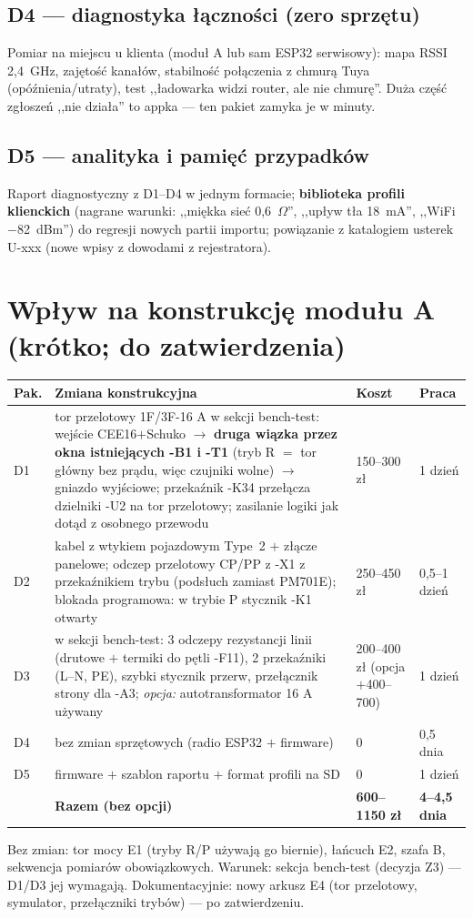 \documentclass[11pt,a4paper]{article}
\newcommand{\ohm}{$\Omega$}
\begin{document}
\subsection{D4 --- diagnostyka łączności (zero sprzętu)}
Pomiar na miejscu u klienta (moduł A lub sam ESP32 serwisowy): mapa RSSI 2,4~GHz, zajętość kanałów,
stabilność połączenia z chmurą Tuya (opóźnienia/utraty), test ,,ładowarka widzi router, ale nie
chmurę''. Duża część zgłoszeń ,,nie działa'' to appka --- ten pakiet zamyka je w minuty.
\subsection{D5 --- analityka i pamięć przypadków}
Raport diagnostyczny z D1--D4 w jednym formacie; \textbf{biblioteka profili klienckich} (nagrane
warunki: ,,miękka sieć 0,6~\ohm'', ,,upływ tła 18~mA'', ,,WiFi $-$82~dBm'') do regresji nowych
partii importu; powiązanie z katalogiem usterek U-xxx (nowe wpisy z dowodami z rejestratora).

\section{Wpływ na konstrukcję modułu A (krótko; do zatwierdzenia)}
\begin{longtable}{@{}p{}p{}p{}p{}@{}}
\toprule
\textbf{Pak.} & \textbf{Zmiana konstrukcyjna} & \textbf{Koszt} & \textbf{Praca}\\
\midrule
D1 & tor przelotowy 1F/3F-16 A w sekcji bench-test: wejście CEE16$+$Schuko $\to$ \textbf{druga
wiązka przez okna istniejących -B1 i -T1} (tryb R $=$ tor główny bez prądu, więc czujniki wolne)
$\to$ gniazdo wyjściowe; przekaźnik -K34 przełącza dzielniki -U2 na tor przelotowy; zasilanie
logiki jak dotąd z osobnego przewodu & 150--300 zł & 1 dzień\\
D2 & kabel z wtykiem pojazdowym Type~2 $+$ złącze panelowe; odczep przelotowy CP/PP z -X1
z przekaźnikiem trybu (podsłuch zamiast PM701E); blokada programowa: w trybie P stycznik -K1
otwarty & 250--450 zł & 0,5--1 dzień\\
D3 & w sekcji bench-test: 3 odczepy rezystancji linii (drutowe $+$ termiki do pętli -F11),
2 przekaźniki (L--N, PE), szybki stycznik przerw, przełącznik strony dla -A3; \emph{opcja:}
autotransformator 16 A używany & 200--400 zł (opcja $+$400--700) & 1 dzień\\
D4 & bez zmian sprzętowych (radio ESP32 $+$ firmware) & 0 & 0,5 dnia\\
D5 & firmware $+$ szablon raportu $+$ format profili na SD & 0 & 1 dzień\\
\midrule
 & \textbf{Razem (bez opcji)} & \textbf{600--1150 zł} & \textbf{4--4,5 dnia}\\
\bottomrule
\end{longtable}
Bez zmian: tor mocy E1 (tryby R/P używają go biernie), łańcuch E2, szafa B, sekwencja pomiarów
obowiązkowych. Warunek: sekcja bench-test (decyzja Z3) --- D1/D3 jej wymagają. Dokumentacyjnie:
nowy arkusz E4 (tor przelotowy, symulator, przełączniki trybów) --- po zatwierdzeniu.
\end{document}
